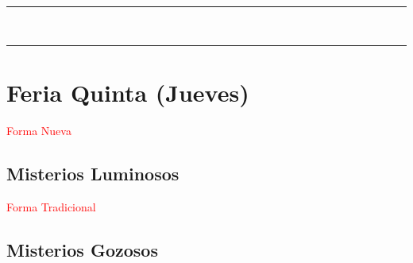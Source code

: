 \documentclass[10pt,twoside]{book}
\begin{document}
\begin{center}
      \begin{spacing}{0.25}
            {\rule{20em}{0.4pt}}\\
            {\rule{20em}{0.4pt}}
      \end{spacing}
\end{center}


\section*{\centering Feria Quinta (Jueves)}

\begin{paracol}{2}
      \begin{leftcolumn*}
            \begin{center}
                  \textcolor{red}{Forma Nueva}
                  \subsection*{Misterios Luminosos}
            \end{center}

            
      \end{leftcolumn*}
      \begin{rightcolumn}
            \begin{center}
                  \textcolor{red}{Forma Tradicional}
                  \subsection*{Misterios Gozosos }
            \end{center}

            
      \end{rightcolumn}
\end{paracol}


\end{document}

